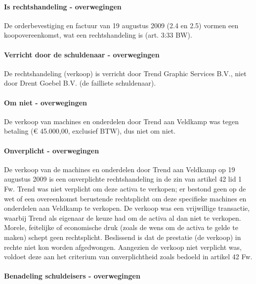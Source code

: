 \documentclass[
  dutch,
  a4paper,
]{article}
\begin{document}
\paragraph{Is rechtshandeling - overwegingen}\label{is-rechtshandeling---overwegingen-63}

De orderbevestiging en factuur van 19 augustus 2009 (2.4 en 2.5) vormen een koopovereenkomst, wat een rechtshandeling is (art. 3:33 BW).

\paragraph{Verricht door de schuldenaar - overwegingen}\label{verricht-door-de-schuldenaar---overwegingen-63}

De rechtshandeling (verkoop) is verricht door Trend Graphic Services B.V., niet door Drent Goebel B.V. (de failliete schuldenaar).

\paragraph{Om niet - overwegingen}\label{om-niet---overwegingen-63}

De verkoop van machines en onderdelen door Trend aan Veldkamp was tegen betaling (€ 45.000,00, exclusief BTW), dus niet om niet.

\paragraph{Onverplicht - overwegingen}\label{onverplicht---overwegingen-63}

De verkoop van de machines en onderdelen door Trend aan Veldkamp op 19 augustus 2009 is een onverplichte rechtshandeling in de zin van artikel 42 lid 1 Fw. Trend was niet verplicht om deze activa te verkopen; er bestond geen op de wet of een overeenkomst berustende rechtsplicht om deze specifieke machines en onderdelen aan Veldkamp te verkopen. De verkoop was een vrijwillige transactie, waarbij Trend als eigenaar de keuze had om de activa al dan niet te verkopen. Morele, feitelijke of economische druk (zoals de wens om de activa te gelde te maken) schept geen rechtsplicht. Beslissend is dat de prestatie (de verkoop) in rechte niet kon worden afgedwongen. Aangezien de verkoop niet verplicht was, voldoet deze aan het criterium van onverplichtheid zoals bedoeld in artikel 42 Fw.

\paragraph{Benadeling schuldeisers - overwegingen}\label{benadeling-schuldeisers---overwegingen-63}
\end{document}
